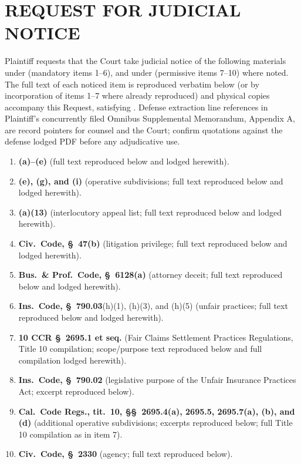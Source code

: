 \newcommand{\docshorttitle}{RJN SUPPLEMENTAL --- \S\S~425.17 / 425.16 / 904.1 / 47 / 6128 / 790.03 / 10 CCR (801)}
\newcommand{\doctitleblock}{REQUEST FOR JUDICIAL NOTICE (SUPPLEMENTAL)}
\newcommand{\docsubblock}{(Evid.\ Code, \S\S~451(a), 452(b), 453; lodge with Notice of Lodging dated Apr.\ 30, 2026)}




\section*{REQUEST FOR JUDICIAL NOTICE}

Plaintiff requests that the Court take judicial notice of the following materials under  (mandatory items 1--6), and under  (permissive items 7--10) where noted. The full text of each noticed item is reproduced verbatim below (or by incorporation of items 1--7 where already reproduced) and physical copies accompany this Request, satisfying . Defense extraction line references in Plaintiff's concurrently filed Omnibus Supplemental Memorandum, Appendix A, are record pointers for counsel and the Court; confirm quotations against the defense lodged PDF before any adjudicative use.

\begin{enumerate}
\tightlist
\item \textbf{(a)--(e)} (full text reproduced below and lodged herewith).
\item \textbf{(e), (g), and (i)} (operative subdivisions; full text reproduced below and lodged herewith).
\item \textbf{(a)(13)} (interlocutory appeal list; full text reproduced below and lodged herewith).
\item \textbf{Civ.\ Code, \S~47(b)} (litigation privilege; full text reproduced below and lodged herewith).
\item \textbf{Bus.\ \& Prof.\ Code, \S~6128(a)} (attorney deceit; full text reproduced below and lodged herewith).
\item \textbf{Ins.\ Code, \S~790.03}(h)(1), (h)(3), and (h)(5) (unfair practices; full text reproduced below and lodged herewith).
\item \textbf{10 CCR \S~2695.1 et seq.} (Fair Claims Settlement Practices Regulations, Title 10 compilation; scope/purpose text reproduced below and full compilation lodged herewith).
\item \textbf{Ins.\ Code, \S~790.02} (legislative purpose of the Unfair Insurance Practices Act; excerpt reproduced below).
\item \textbf{Cal.\ Code Regs., tit.\ 10, \S\S~2695.4(a), 2695.5, 2695.7(a), (b), and (d)} (additional operative subdivisions; excerpts reproduced below; full Title 10 compilation as in item 7).
\item \textbf{Civ.\ Code, \S~2330} (agency; full text reproduced below).
\end{enumerate}

